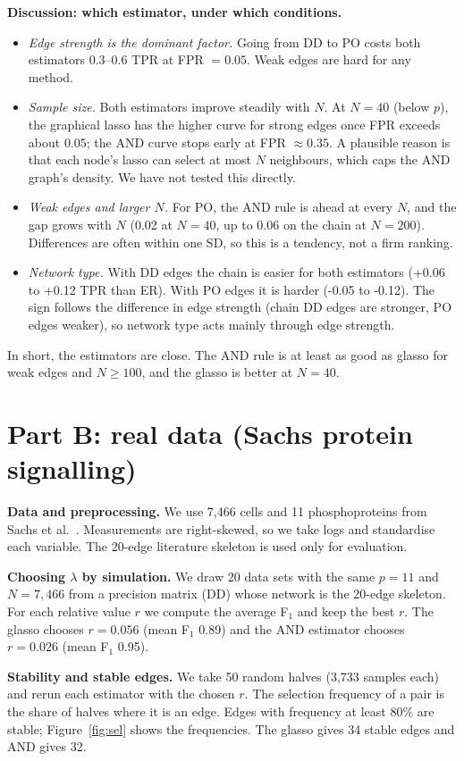 \documentclass[10pt]{article}
\begin{document}
\textbf{Discussion: which estimator, under which conditions.}
\begin{itemize}
\item \emph{Edge strength is the dominant factor.} Going from DD to PO costs both estimators $0.3$--$0.6$ TPR at FPR $=0.05$. Weak edges are hard for any method.
\item \emph{Sample size.} Both estimators improve steadily with $N$. At $N=40$ (below $p$), the graphical lasso has the higher curve for strong edges once FPR exceeds about $0.05$; the AND curve stops early at FPR $\approx 0.35$. A plausible reason is that each node's lasso can select at most $N$ neighbours, which caps the AND graph's density. We have not tested this directly.
\item \emph{Weak edges and larger $N$.} For PO, the AND rule is ahead at every $N$, and the gap grows with $N$ (0.02 at $N=40$, up to 0.06 on the chain at $N=200$). Differences are often within one SD, so this is a tendency, not a firm ranking.
\item \emph{Network type.} With DD edges the chain is easier for both estimators (+0.06 to +0.12 TPR than ER). With PO edges it is harder (-0.05 to -0.12). The sign follows the difference in edge strength (chain DD edges are stronger, PO edges weaker), so network type acts mainly through edge strength.
\end{itemize}
In short, the estimators are close. The AND rule is at least as good as glasso for weak edges and $N\ge 100$, and the glasso is better at $N=40$.

\section{Part B: real data (Sachs protein signalling)}
\textbf{Data and preprocessing.} We use 7,466 cells and 11 phosphoproteins from Sachs et al.\ \cite{sachs2005}. Measurements are right-skewed, so we take logs and standardise each variable. The 20-edge literature skeleton is used only for evaluation.

\textbf{Choosing $\lambda$ by simulation.} We draw 20 data sets with the same $p=11$ and $N=7{,}466$ from a precision matrix (DD) whose network is the 20-edge skeleton. For each relative value $r$ we compute the average F$_1$ and keep the best $r$. The glasso chooses $r=0.056$ (mean F$_1$ 0.89) and the AND estimator chooses $r=0.026$ (mean F$_1$ 0.95).

\textbf{Stability and stable edges.} We take 50 random halves (3,733 samples each) and rerun each estimator with the chosen $r$. The selection frequency of a pair is the share of halves where it is an edge. Edges with frequency at least $80\%$ are stable; Figure~\ref{fig:sel} shows the frequencies. The glasso gives 34 stable edges and AND gives 32.
\end{document}
